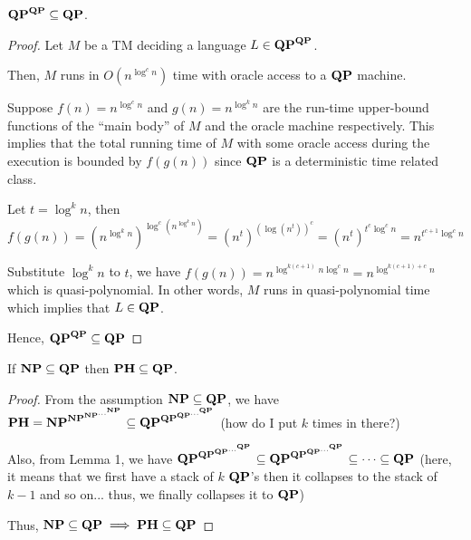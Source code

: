 \documentclass[12pt]{article}
\theoremstyle{definition}
\begin{document}
\newpage

\begin{lemma}
	\label{lem:qp-collapse}
	$\mathbf{QP}^{\mathbf{QP}} \subseteq \mathbf{QP}$.
\end{lemma}

\begin{proof}
	Let $M$ be a TM deciding a language $L \in \mathbf{QP}^{\mathbf{QP}}$.
	
	Then, $M$ runs in $O(n^{\log^c n})$ time with oracle access to a $\mathbf{QP}$ machine.
	
	Suppose $f(n) = n^{\log^c n}$ and $g(n) = n^{\log^k n}$ are the run-time upper-bound functions of the ``main body'' of $M$ and the oracle machine respectively. This implies that the total running time of $M$ with some oracle access during the execution is bounded by $f(g(n))$ since $\mathbf{QP}$ is a deterministic time related class.
	
	Let $t = \log^k n$, then $f(g(n)) = (n^{\log^k n})^{\log^c (n^{\log^k n})} = (n^t)^{(\log(n^t))^c} = (n^t)^{t^c \log^c n} = n^{t^{c+1}\log^c n}$
	
	Substitute $\log^k n$ to $t$, we have $f(g(n)) = n^{\log^{k(c+1)} n \log^c n} = n^{\log^{k(c+1) + c} n}$ which is quasi-polynomial. In other words, $M$ runs in quasi-polynomial time which implies that $L \in \mathbf{QP}$.
	
	Hence, $\mathbf{QP}^{\mathbf{QP}} \subseteq \mathbf{QP}$
	
\end{proof}

\begin{lemma}
  \label{lem:ph-sub-qp}
  If $\mathbf{NP} \subseteq \mathbf{QP}$ then
  $\mathbf{PH} \subseteq \mathbf{QP}$.
\end{lemma}

\begin{proof}
	From the assumption $\mathbf{NP} \subseteq \mathbf{QP}$, we have $\mathbf{PH} = \mathbf{NP}^{\mathbf{NP}^{\mathbf{NP}^{\dots^{\mathbf{NP}}}}} \subseteq \mathbf{QP}^{\mathbf{QP}^{\mathbf{QP}^{\dots^{\mathbf{QP}}}}}$ (how do I put $k$ times in there?)
	
	Also, from Lemma 1, we have $\mathbf{QP}^{\mathbf{QP}^{\mathbf{QP}^{\dots^{\mathbf{QP}}}}} \subseteq \mathbf{QP}^{\mathbf{QP}^{\mathbf{QP}^{\dots^{\mathbf{QP}}}}} \subseteq \dots \subseteq \mathbf{QP}$ (here, it means that we first have a stack of $k$ $\mathbf{QP}$'s then it collapses to the stack of $k - 1$ and so on... thus, we finally collapses it to $\mathbf{QP}$)
	
	Thus, $\mathbf{NP} \subseteq \mathbf{QP} \implies \mathbf{PH} \subseteq \mathbf{QP}$
\end{proof}
\end{document}
